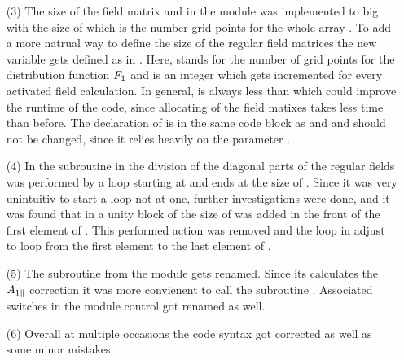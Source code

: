 \begin{enumerate}
    \newpage
    \item[(3)] The size of the field matrix  and  in the module  was implemented to big with the size of  which is the number grid points for the whole array . To add a more natrual way to define the size of the regular field matrices the new variable  gets defined as  in . Here,  stands for the number of grid points for the distribution function $F_1$ and  is an integer which gets incremented for every activated field calculation. In general,  is always less than  which could improve the runtime of the code, since allocating of the field matixes takes less time than before. The declaration of  is in the same code block as  and  and should not be changed, since it relies heavily on the parameter .
    \item[(4)] In the subroutine  in  the division of the diagonal parts of the regular fields was performed by a loop starting at  and ends at the size of . Since it was very unintuitiv to start a loop not at one, further investigations were done, and it was found that in  a unity block of the size of  was added in the front of the first element of . This performed action was removed and the loop in  adjust to loop from the first element to the last element of .
    \item[(5)] The subroutine  from the module  gets renamed. Since its calculates the $A_{1\parallel}$ correction it was more convienent to call the subroutine . Associated switches in the module control got renamed as well.
    \item[(6)] Overall at multiple occasions the code syntax got corrected as well as some minor mistakes. 
\end{enumerate} 

\newpage